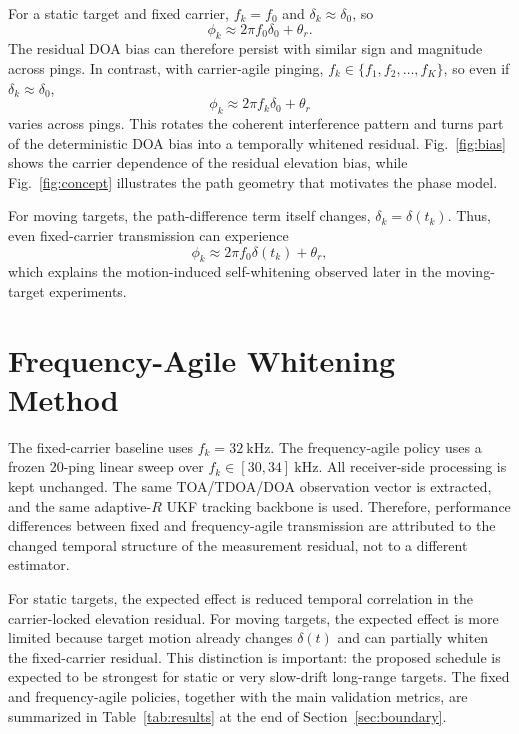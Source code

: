 \documentclass[journal]{IEEEtran}
\begin{document}
For a static target and fixed carrier, $f_k=f_0$ and $\delta_k\approx\delta_0$, so
\begin{equation}
\phi_k\approx 2\pi f_0\delta_0+\theta_r.
\end{equation}
The residual DOA bias can therefore persist with similar sign and magnitude across pings. In
contrast, with carrier-agile pinging, $f_k\in\{f_1,f_2,\ldots,f_K\}$, so even if
$\delta_k\approx\delta_0$,
\begin{equation}
\phi_k\approx 2\pi f_k\delta_0+\theta_r
\end{equation}
varies across pings. This rotates the coherent interference pattern and turns part of the
deterministic DOA bias into a temporally whitened residual. Fig.~\ref{fig:bias} shows the carrier
dependence of the residual elevation bias, while Fig.~\ref{fig:concept} illustrates the path
geometry that motivates the phase model.

For moving targets, the path-difference term itself changes, $\delta_k=\delta(t_k)$. Thus, even
fixed-carrier transmission can experience
\begin{equation}
\phi_k\approx 2\pi f_0\delta(t_k)+\theta_r,
\end{equation}
which explains the motion-induced self-whitening observed later in the moving-target experiments.

\section{Frequency-Agile Whitening Method}
The fixed-carrier baseline uses $f_k=32~\mathrm{kHz}$. The frequency-agile policy uses a frozen
20-ping linear sweep over $f_k\in[30,34]~\mathrm{kHz}$. All receiver-side processing is kept
unchanged. The same TOA/TDOA/DOA observation vector is extracted, and the same adaptive-$R$ UKF
tracking backbone is used. Therefore, performance differences between fixed and frequency-agile
transmission are attributed to the changed temporal structure of the measurement residual, not to
a different estimator.

For static targets, the expected effect is reduced temporal correlation in the carrier-locked
elevation residual. For moving targets, the expected effect is more limited because target motion
already changes $\delta(t)$ and can partially whiten the fixed-carrier residual. This distinction
is important: the proposed schedule is expected to be strongest for static or very slow-drift
long-range targets. The fixed and frequency-agile policies, together with the main validation
metrics, are summarized in Table~\ref{tab:results} at the end of Section~\ref{sec:boundary}.
\end{document}
